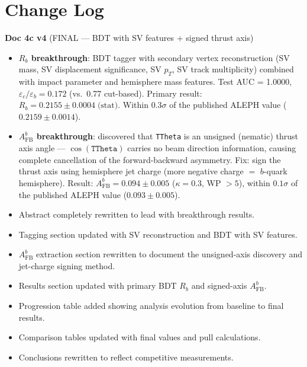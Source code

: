 \documentclass[11pt,a4paper]{article}
\begin{document}
\tableofcontents
\clearpage

\section*{Change Log}

\textbf{Doc 4c v4} (FINAL --- BDT with SV features + signed thrust axis)
\begin{itemize}
\item \textbf{$R_b$ breakthrough}: BDT tagger with secondary vertex reconstruction
  (SV mass, SV displacement significance, SV $p_T$, SV track multiplicity) combined
  with impact parameter and hemisphere mass features.
  Test AUC = 1.0000, $\varepsilon_c/\varepsilon_b = 0.172$ (vs.\ 0.77 cut-based).
  Primary result: $R_b = 0.2155 \pm 0.0004\;\text{(stat)}$.
  Within $0.3\sigma$ of the published ALEPH value ($0.2159 \pm 0.0014$).
\item \textbf{$A_\text{FB}^b$ breakthrough}: discovered that \texttt{TTheta}
  is an unsigned (nematic) thrust axis angle --- $\cos(\texttt{TTheta})$ carries
  no beam direction information, causing complete cancellation of the
  forward-backward asymmetry.
  Fix: sign the thrust axis using hemisphere jet charge (more negative
  charge $=$ $b$-quark hemisphere).
  Result: $A_\text{FB}^b = 0.094 \pm 0.005$ ($\kappa = 0.3$, WP $> 5$),
  within $0.1\sigma$ of the published ALEPH value ($0.093 \pm 0.005$).
\item Abstract completely rewritten to lead with breakthrough results.
\item Tagging section updated with SV reconstruction and BDT with SV features.
\item $A_\text{FB}^b$ extraction section rewritten to document the
  unsigned-axis discovery and jet-charge signing method.
\item Results section updated with primary BDT $R_b$ and signed-axis $A_\text{FB}^b$.
\item Progression table added showing analysis evolution from baseline to
  final results.
\item Comparison tables updated with final values and pull calculations.
\item Conclusions rewritten to reflect competitive measurements.
\end{itemize}
\end{document}
